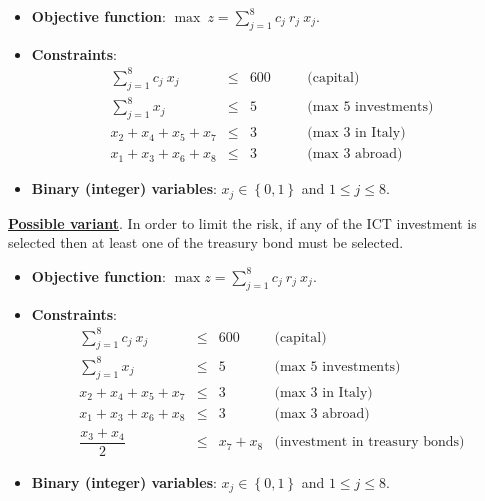 \begin{examplebox}
\begin{itemize}
        \item \textbf{Objective function}: $\max \: z = \displaystyle\sum_{j=1}^{8} c_{j} \: r_{j} \: x_{j}$.

        \item \textbf{Constraints}:
        \begin{equation*}
            \begin{array}{rclcl}
                \displaystyle\sum_{j=1}^{8}c_{j} \: x_{j} &\le& 600 &\hspace{1em}& \text{(capital)} \\ [2em]
                \displaystyle\sum_{j=1}^{8}x_{j} &\le& 5 &\hspace{1em}& \text{(max 5 investments)} \\ [2em]
                x_{2}+x_{4}+x_{5}+x_{7} &\le& 3 &\hspace{1em}& \text{(max 3 in Italy)} \\ [.5em]
                x_{1}+x_{3}+x_{6}+x_{8} &\le& 3 &\hspace{1em}& \text{(max 3 abroad)}
            \end{array}
        \end{equation*}

        \item \textbf{Binary (integer) variables}: $x_{j} \in \left\{0,1\right\}$ and $1 \le j \le 8$.
    \end{itemize}

    \underline{\textbf{Possible variant}}. In order to limit the risk, if any of the ICT investment is selected then at least one of the treasury bond must be selected.
    \begin{itemize}
        \item \textbf{Objective function}: $\max z = \displaystyle\sum_{j=1}^{8} c_{j} \: r_{j} \: x_{j}$.

        \item \textbf{Constraints}:
        \begin{equation*}
            \begin{array}{rcll}
                \displaystyle\sum_{j=1}^{8}c_{j} \: x_{j} &\le& 600 & \text{(capital)} \\ [2em]
                \displaystyle\sum_{j=1}^{8}x_{j} &\le& 5 & \text{(max 5 investments)} \\ [2em]
                x_{2}+x_{4}+x_{5}+x_{7} &\le& 3 & \text{(max 3 in Italy)} \\ [.5em]
                x_{1}+x_{3}+x_{6}+x_{8} &\le& 3 & \text{(max 3 abroad)} \\ [1em]
                \dfrac{x_{3} + x_{4}}{2} &\le& x_{7} + x_{8} & \text{(investment in treasury bonds)}
            \end{array}
        \end{equation*}

        \item \textbf{Binary (integer) variables}: $x_{j} \in \left\{0,1\right\}$ and $1 \le j \le 8$.
    \end{itemize}
\end{examplebox}

